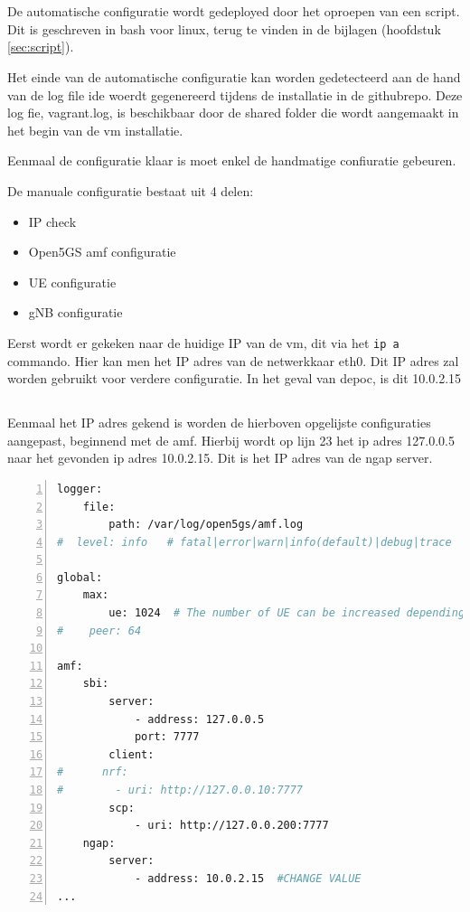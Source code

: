 \section{}%
\label{sec:Config}%

De automatische configuratie wordt gedeployed door het oproepen van een script. Dit is geschreven in bash voor linux, terug te vinden in de bijlagen (hoofdstuk \ref{sec:script}).

Het einde van de automatische configuratie kan worden gedetecteerd aan de hand van de log file ide woerdt gegenereerd tijdens de installatie in de githubrepo. Deze log fie, vagrant.log, is beschikbaar door de shared folder die wordt aangemaakt in het begin van de \gls{vm} installatie. 

Eenmaal de configuratie klaar is moet enkel de handmatige confiuratie gebeuren.

De manuale configuratie bestaat uit 4 delen:

\begin{itemize}
    \item IP check
    \item Open5GS \gls{amf} configuratie
    \item UE configuratie
    \item gNB configuratie
\end{itemize}

Eerst wordt er gekeken naar de huidige IP van de \gls{vm}, dit via het \verb|ip a| commando. Hier kan men het IP adres van de netwerkkaar eth0. Dit IP adres zal worden gebruikt voor verdere configuratie. In het geval van de\gls{poc}, is dit 10.0.2.15

\subsection{}%
\label{sec:open5gs_amf}%

Eenmaal het IP adres gekend is worden de hierboven opgelijste configuraties aangepast, beginnend met de \gls{amf}. Hierbij wordt op lijn 23 het ip adres 127.0.0.5 naar het gevonden ip adres 10.0.2.15. Dit is het IP  adres van de ngap server.

\begin{lstlisting}[basicstyle=\small, frame=single, breaklines=true, postbreak=\mbox{\textcolor{red}{$\hookrightarrow$}\space}, escapeinside ={\%,}, escapechar={!}, numbers=left, language=sh, caption=Open5GS amf configuratie]
logger:
    file:
        path: /var/log/open5gs/amf.log
#  level: info   # fatal|error|warn|info(default)|debug|trace

global:
    max:
        ue: 1024  # The number of UE can be increased depending on memory size.
#    peer: 64

amf:
    sbi:
        server:
            - address: 127.0.0.5
            port: 7777
        client:
#      nrf:
#        - uri: http://127.0.0.10:7777
        scp:
            - uri: http://127.0.0.200:7777
    ngap:
        server:
            - address: 10.0.2.15  #CHANGE VALUE
...
\end{lstlisting}

